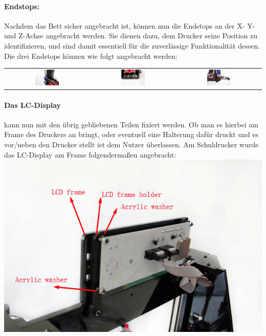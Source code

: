 \paragraph{Endstops:} Nachdem das Bett sicher angebracht ist, können nun die Endstops an der X- Y- und Z-Achse angebracht werden. Sie dienen dazu, dem Drucker seine Position zu identifizieren, und sind damit essentiell für die zuverlässige Funktionalität dessen. Die drei Endstops können wie folgt angebracht werden:\\
\begin{tabular}{ccc}
\includegraphics[clip=true, trim=150 80 150 80, width=0.3\textwidth]{Bilder/Endstop_X.png} & 
\includegraphics[clip=true, trim=165 80 135 78, width=0.3\textwidth]{Bilder/Endstop_Y.png} & 
\includegraphics[clip=true, trim=120 60 140 58, width=0.3\textwidth]{Bilder/Endstop_Z.png} \\ 
\end{tabular} 

\paragraph{Das LC-Display} kann nun mit den übrig gebliebenen Teilen fixiert werden. Ob man es hierbei am Frame des Druckers an bringt, oder eventuell eine Halterung dafür druckt und es vor/neben den Drucker stellt ist dem Nutzer überlassen. Am Schuldrucker wurde das LC-Display am Frame folgendermaßen angebracht:\\
\includegraphics[width=\textwidth]{Bilder/LCD.png}

